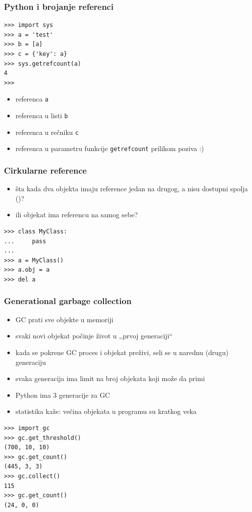 \documentclass[compress,aspectratio=169]{beamer}
\begin{document}
\begin{frame}
  \frametitle{Python i brojanje referenci}
\begin{verbatim}
>>> import sys
>>> a = 'test'
>>> b = [a]
>>> c = {'key': a}
>>> sys.getrefcount(a)
4
>>> 
\end{verbatim}
\begin{itemize}
  \item referenca \texttt{a}
  \item referenca u listi \texttt{b}
  \item referenca u rečniku \texttt{c}
  \item referenca u parametru funkcije \texttt{getrefcount} prilikom poziva :)
\end{itemize}
\end{frame}

\begin{frame}[fragile]
  \frametitle{Cirkularne reference}
  \begin{itemize}
    \item šta kada dva objekta imaju reference jedan na drugog, a
      nisu dostupni spolja ()?
    \item ili objekat ima referencu na samog sebe?
  \end{itemize}
\begin{verbatim}
>>> class MyClass:
...     pass
...
>>> a = MyClass()
>>> a.obj = a
>>> del a
\end{verbatim}
\end{frame}

\begin{frame}
  \frametitle{Generational garbage collection}
  \begin{itemize}
    \item GC prati sve objekte u memoriji
    \item svaki novi objekat počinje život u ,,prvoj generaciji``
    \item kada se pokrene GC proces i objekat preživi, seli se u
      narednu (drugu) generaciju
    \item svaka generacija ima limit na broj objekata koji može da primi
    \item Python ima 3 generacije za GC
    \item statistika kaže: većina objekata u programu su kratkog veka
  \end{itemize}
\begin{verbatim}
>>> import gc
>>> gc.get_threshold()
(700, 10, 10)
>>> gc.get_count()
(445, 3, 3)
>>> gc.collect()
115
>>> gc.get_count()
(24, 0, 0)
\end{verbatim}
\end{frame}
\end{document}

